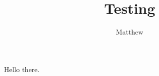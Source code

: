 \documentclass[11pt]{article}
\title{Testing}
\author{Matthew}
\begin{document}
\maketitle
Hello there.
\end{document}
